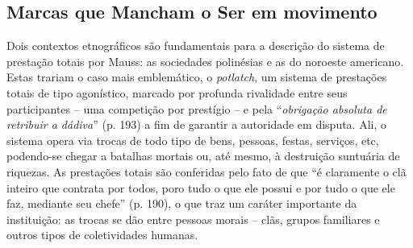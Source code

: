 \subsection{Marcas que Mancham o Ser em movimento}

Dois contextos etnográficos são fundamentais para a descrição do sistema de prestação totais por Mauss:
as sociedades polinésias e as do noroeste americano.
Estas trariam o caso mais emblemático, o \textit{potlatch}, um sistema de prestações totais de tipo agonístico, marcado por profunda rivalidade entre seus participantes -- uma competição por prestígio -- e pela \enquote{\textit{obrigação absoluta de retribuir a dádiva}} (p. 193) a fim de garantir a autoridade em disputa.
Ali, o sistema opera via trocas de todo tipo de bens, pessoas, festas, serviços, etc, podendo-se chegar a batalhas mortais ou, até mesmo, à destruição suntuária de riquezas.
As prestações totais são conferidas pelo fato de que \enquote{é claramente o clã inteiro que contrata por todos, poro tudo o que ele possui e por tudo o que ele faz, mediante seu chefe} (p. 190), o que traz um caráter importante da instituição:
as trocas se dão entre pessoas morais -- clãs, grupos familiares e outros tipos de coletividades humanas.
